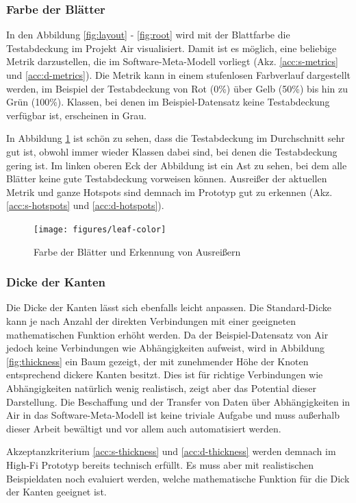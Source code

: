 \subsubsection*{Farbe der Blätter}

In den Abbildung \ref{fig:layout} - \ref{fig:root} wird mit der Blattfarbe die Testabdeckung im Projekt Air visualisiert. Damit ist es möglich, eine beliebige Metrik darzustellen, die im Software-Meta-Modell vorliegt (Akz. \ref{acc:s-metrics} und \ref{acc:d-metrics}). Die Metrik kann in einem stufenlosen Farbverlauf dargestellt werden, im Beispiel der Testabdeckung von Rot (0\%) über Gelb (50\%) bis hin zu Grün (100\%). Klassen, bei denen im Beispiel-Datensatz keine Testabdeckung verfügbar ist, erscheinen in Grau.

In Abbildung \ref{fig:leaf-color} ist schön zu sehen, dass die Testabdeckung im Durchschnitt sehr gut ist, obwohl immer wieder Klassen dabei sind, bei denen die Testabdeckung gering ist. Im linken oberen Eck der Abbildung ist ein Ast zu sehen, bei dem alle Blätter keine gute Testabdeckung vorweisen können. Ausreißer der aktuellen Metrik und ganze Hotspots sind demnach im Prototyp gut zu erkennen (Akz. \ref{acc:s-hotspots} und \ref{acc:d-hotspots}).

\begin{figure}[htb]
  \texttt{[image: figures/leaf-color]}
  \caption{Farbe der Blätter und Erkennung von Ausreißern}
  \label{fig:leaf-color}
\end{figure}

\subsubsection*{Dicke der Kanten}

Die Dicke der Kanten lässt sich ebenfalls leicht anpassen. Die Standard-Dicke kann je nach Anzahl der direkten Verbindungen mit einer geeigneten mathematischen Funktion erhöht werden. Da der Beispiel-Datensatz von Air jedoch keine Verbindungen wie Abhängigkeiten aufweist, wird in Abbildung \ref{fig:thickness} ein Baum gezeigt, der mit zunehmender Höhe der Knoten entsprechend dickere Kanten besitzt. Dies ist für richtige Verbindungen wie Abhängigkeiten natürlich wenig realistisch, zeigt aber das Potential dieser Darstellung. Die Beschaffung und der Transfer von Daten über Abhängigkeiten in Air in das Software-Meta-Modell ist keine triviale Aufgabe und muss außerhalb dieser Arbeit bewältigt und vor allem auch automatisiert werden.

Akzeptanzkriterium \ref{acc:s-thickness} und \ref{acc:d-thickness} werden demnach im High-Fi Prototyp bereits technisch erfüllt. Es muss aber mit realistischen Beispieldaten noch evaluiert werden, welche mathematische Funktion für die Dick der Kanten geeignet ist.

